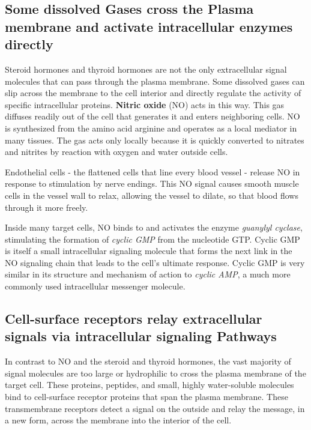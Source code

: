 \subsection{Some dissolved Gases cross the Plasma membrane and activate intracellular enzymes directly}

Steroid hormones and thyroid hormones are not the only extracellular
signal molecules that can pass through the plasma membrane. Some
dissolved gases can slip across the membrane to the cell interior and
directly regulate the activity of specific intracellular proteins.
\textbf{Nitric oxide} (NO) acts in this way. This gas diffuses readily out of
the cell that generates it and enters neighboring cells. NO is synthesized
from the amino acid arginine and operates as a local mediator in many
tissues. The gas acts only locally because it is quickly converted to
nitrates and nitrites by reaction with oxygen and water outside cells.

Endothelial cells - the flattened cells that line every blood vessel - release
NO in response to stimulation by nerve endings. This NO signal causes
smooth muscle cells in the vessel wall to relax, allowing the vessel to
dilate, so that blood flows through it more freely.

Inside many target cells, NO binds to and activates the enzyme \textit{guanylyl
cyclase}, stimulating the formation of \textit{cyclic GMP} from the nucleotide GTP.
Cyclic GMP is itself a small intracellular signaling
molecule that forms the next link in the NO signaling chain that leads to
the cell’s ultimate response. Cyclic GMP is very similar in its structure and mechanism
of action to \textit{cyclic AMP}, a much more commonly used intracellular 
messenger molecule.

\subsection{Cell-surface receptors relay extracellular signals via intracellular signaling Pathways}

In contrast to NO and the steroid and thyroid hormones, the vast majority 
of signal molecules are too large or hydrophilic to cross the plasma
membrane of the target cell. These proteins, peptides, and small, highly
water-soluble molecules bind to cell-surface receptor proteins that span
the plasma membrane. These transmembrane receptors 
detect a signal on the outside and relay the message, in a new form,
across the membrane into the interior of the cell.

